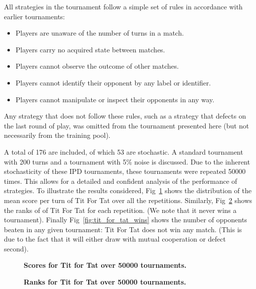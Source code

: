 \documentclass[10pt,letterpaper]{article}
\begin{document}
All strategies in the tournament follow a simple set of
rules in accordance with earlier tournaments:

\begin{itemize}
  \item Players are unaware of the number of turns in a match.
  \item Players carry no acquired state between matches.
  \item Players cannot observe the outcome of other matches.
  \item Players cannot identify their opponent by any label or identifier.
  \item Players cannot manipulate or inspect their opponents in any way.
\end{itemize}

Any strategy that does not follow these rules, such as a strategy that defects
on the last round of play, was omitted from the tournament presented here (but
not necessarily from the training pool).

A total of 176 are included, of which
53 are stochastic.
A standard tournament with 200
turns and a tournament with 5\% noise is
discussed. Due to the inherent stochasticity of these IPD tournaments, these
tournaments were repeated 50000
times. This allows for a detailed and confident analysis of the performance of
strategies. To illustrate the results considered,
Fig~\ref{fig:tit_for_tat_scores} shows the distribution of the mean score per
turn of Tit For Tat over all the repetitions. Similarly,
Fig~\ref{fig:tit_for_tat_ranks} shows the ranks of of Tit For Tat for each
repetition. (We note that it never wins a tournament). Finally
Fig~\ref{fig:tit_for_tat_wins} shows the number of opponents beaten in any given
tournament: Tit For Tat does not win any match. (This is due to the fact that it
will either draw with mutual cooperation or defect second).

\begin{figure}[!hbtp]
        \centering
        \caption{\bf Scores for Tit for Tat over
        50000 tournaments.}
        \label{fig:tit_for_tat_scores}
\end{figure}

\begin{figure}[!hbtp]
        \centering
        \caption{\bf Ranks for Tit for Tat over
        50000 tournaments.}
        \label{fig:tit_for_tat_ranks}
\end{figure}
\end{document}
